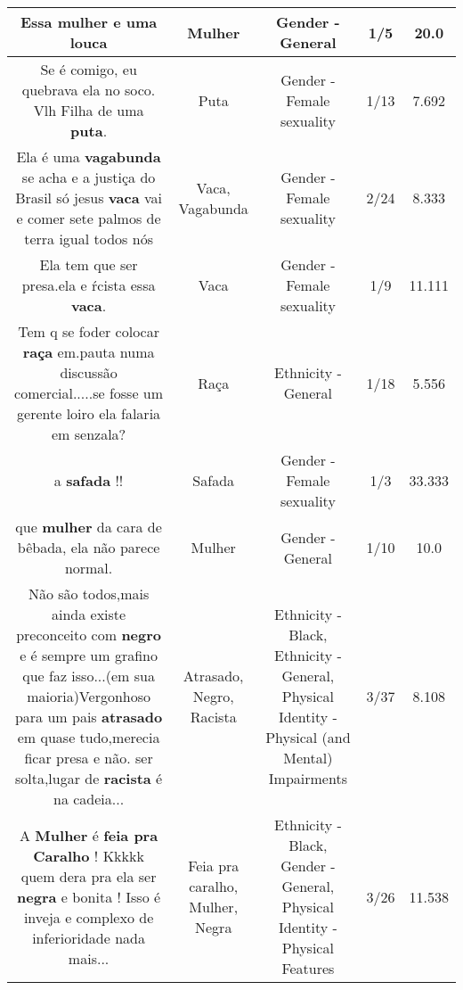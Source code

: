 \documentclass[11pt]{article}
\newlength\mylength
\begin{document}
\begin{center}
\begin{longtable}{|C{.65\mylength}|C{.30\mylength}|C{.12\mylength}|C{.12\mylength}|C{.12\mylength}|}
  \small Essa \textbf{mulher} e uma louca\normalsize   & Mulher & Gender - General & 1/5 & 20.0 \\  \hline
  \small Se é comigo, eu quebrava ela no soco. Vlh Filha de uma \textbf{puta}.\normalsize   & Puta & Gender - Female sexuality & 1/13 & 7.692 \\  \hline
  \small Ela é uma \textbf{vagabunda} se acha e a justiça do Brasil só jesus \textbf{vaca} vai e comer sete palmos de terra igual todos nós\normalsize   & Vaca, Vagabunda & Gender - Female sexuality & 2/24 & 8.333 \\  \hline
  \small Ela tem que ser presa.ela e ŕcista essa \textbf{vaca}.\normalsize   & Vaca & Gender - Female sexuality & 1/9 & 11.111 \\  \hline
  \small Tem q se foder colocar \textbf{raça} em.pauta numa discussão comercial.....se fosse um gerente loiro ela falaria em senzala?\normalsize   & Raça & Ethnicity - General & 1/18 & 5.556 \\  \hline
  \small a \textbf{safada}  !!\normalsize   & Safada & Gender - Female sexuality & 1/3 & 33.333 \\  \hline
  \small que \textbf{mulher} da cara de bêbada, ela não parece normal.\normalsize   & Mulher & Gender - General & 1/10 & 10.0 \\  \hline
  \small Não são todos,mais ainda existe preconceito com \textbf{negro} e é sempre um grafino que faz isso...(em sua maioria)Vergonhoso para um pais \textbf{atrasado} em quase tudo,merecia ficar presa e não. ser solta,lugar de \textbf{racista} é na cadeia...\normalsize   & Atrasado, Negro, Racista & Ethnicity - Black, Ethnicity - General, Physical Identity - Physical (and Mental) Impairments & 3/37 & 8.108 \\  \hline
  \small A \textbf{Mulher} é \textbf{feia pra Caralho} ! Kkkkk quem dera pra ela ser \textbf{negra} e bonita ! Isso é inveja e complexo de inferioridade nada mais...\normalsize   & Feia pra caralho, Mulher, Negra & Ethnicity - Black, Gender - General, Physical Identity - Physical Features & 3/26 & 11.538 \\  \hline

\end{longtable}
\end{center}
\end{document}
